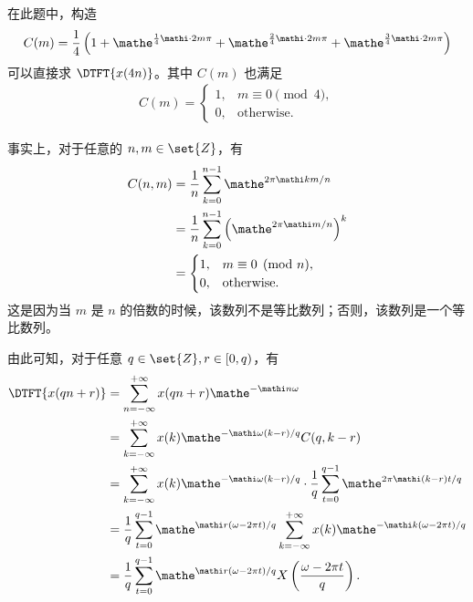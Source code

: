 \begin{remark}
    在此题中，构造
    \begin{align*}
        C(m) = \frac{1}{4}\left(1 + \mathe^{\frac{1}{4}\mathi \cdot 2m\pi}
            + \mathe^{\frac{2}{4}\mathi \cdot 2m\pi}
            + \mathe^{\frac{3}{4}\mathi \cdot 2m\pi}\right)
    \end{align*}
    可以直接求 $\DTFT{x(4n)}$。其中 $C(m)$ 也满足
    \begin{align*}
        C(m) = \begin{cases}
            1, & m \equiv 0 \pmod{4}, \\
            0, & \text{otherwise}.
        \end{cases}
    \end{align*}
\end{remark}

\begin{note}
    事实上，对于任意的 $n, m \in \set{Z}$，有
    \begin{align*}
        C(n, m) & = \frac{1}{n}\sum_{k = 0}^{n-1}\mathe^{2\pi\mathi km/n} \\
        & = \frac{1}{n}\sum_{k = 0}^{n-1}\left(\mathe^{2\pi\mathi m/n}\right)^k \\
        & = \begin{cases}
            1, & m \equiv 0 \pmod{n}, \\
            0, & \text{otherwise}.
        \end{cases}
    \end{align*}
    这是因为当 $m$ 是 $n$ 的倍数的时候，该数列不是等比数列；否则，该数列是一个等比数列。

    由此可知，对于任意 $q \in \set{Z}, r \in [0, q)$，有
    \begin{align*}
        \DTFT{x(qn + r)} & = \sum_{n = -\infty}^{+\infty}x(qn + r)\mathe^{-\mathi n\omega} \\
        & = \sum_{k = -\infty}^{+\infty}x(k)\mathe^{-\mathi\omega (k-r)/q}C(q, k-r) \\
        & = \sum_{k = -\infty}^{+\infty}x(k)\mathe^{-\mathi\omega (k-r)/q}\cdot \frac{1}{q}\sum_{t = 0}^{q - 1}\mathe^{2\pi\mathi (k-r)t/q} \\
        & = \frac{1}{q}\sum_{t = 0}^{q - 1}\mathe^{\mathi r(\omega - 2\pi t)/q}\sum_{k = -\infty}^{+\infty}x(k)\mathe^{-\mathi k (\omega - 2\pi t)/q} \\
        & = \frac{1}{q}\sum_{t = 0}^{q - 1}\mathe^{\mathi r(\omega - 2\pi t)/q}X\left(\frac{\omega - 2\pi t}{q}\right).
    \end{align*}
\end{note}

